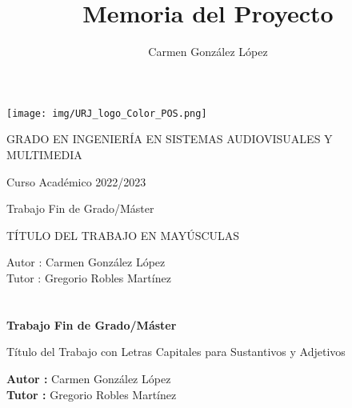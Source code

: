 \documentclass[a4paper, 12pt]{book}
\title{Memoria del Proyecto}
\author{Carmen González López}
\begin{document}
\renewcommand{\refname}{Bibliografía}  %
\renewcommand{\appendixname}{Apéndice}


\begin{titlepage}
\begin{center}
\texttt{[image: img/URJ\_logo\_Color\_POS.png]}

\vspace{1.75cm}

\Large
GRADO EN INGENIERÍA EN SISTEMAS AUDIOVISUALES Y MULTIMEDIA

\vspace{0.4cm}

\large
Curso Académico 2022/2023

\vspace{0.8cm}

Trabajo Fin de Grado/Máster

\vspace{2.5cm}

\LARGE
TÍTULO DEL TRABAJO EN MAYÚSCULAS

\vspace{4cm}

\large
Autor : Carmen González López \\
Tutor : Gregorio Robles Martínez
\end{center}
\end{titlepage}

\newpage
\mbox{}
\thispagestyle{empty} %


\clearpage
{}
\chapter*{}

\vspace{-4cm}
\begin{center}
\LARGE
\textbf{Trabajo Fin de Grado/Máster}

\vspace{1cm}
\large
Título del Trabajo con Letras Capitales para Sustantivos y Adjetivos

\vspace{1cm}
\large
\textbf{Autor :} Carmen González López\\
\textbf{Tutor :} Gregorio Robles Martínez

\end{center}
\end{document}
